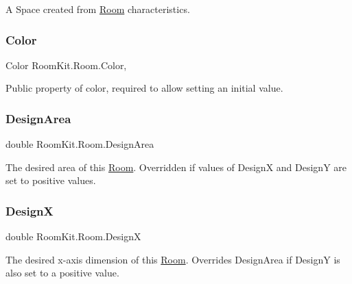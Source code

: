 A Space created from \mbox{\hyperlink{class_room_kit_1_1_room}{Room}} characteristics. 

\mbox{\label{class_room_kit_1_1_room_ab988d7b6d772b68911acacc8da422052}} 
\subsubsection{\texorpdfstring{Color}{Color}}
{\footnotesize\ttfamily Color Room\+Kit.\+Room.\+Color\hspace{0.3cm}{\ttfamily [get]}, {\ttfamily [set]}}



Public property of color, required to allow setting an initial value. 

\mbox{\label{class_room_kit_1_1_room_ac80adf0821785646dbf908dbcbbb29c8}} 
\subsubsection{\texorpdfstring{Design\+Area}{DesignArea}}
{\footnotesize\ttfamily double Room\+Kit.\+Room.\+Design\+Area\hspace{0.3cm}{\ttfamily [get]}}



The desired area of this \mbox{\hyperlink{class_room_kit_1_1_room}{Room}}. Overridden if values of DesignX and DesignY are set to positive values. 

\mbox{\label{class_room_kit_1_1_room_a06bea9a7fbe4558b681f9a047ac03f57}} 
\subsubsection{\texorpdfstring{DesignX}{DesignX}}
{\footnotesize\ttfamily double Room\+Kit.\+Room.\+DesignX\hspace{0.3cm}{\ttfamily [get]}}



The desired x-\/axis dimension of this \mbox{\hyperlink{class_room_kit_1_1_room}{Room}}. Overrides Design\+Area if DesignY is also set to a positive value. 

